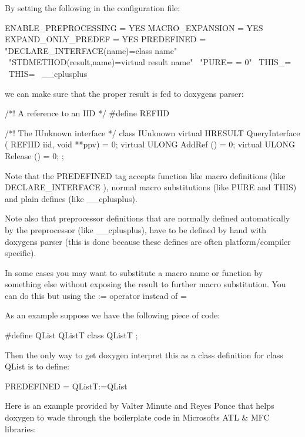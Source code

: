 By setting the following in the configuration file\+:

\begin{DoxyVerb}ENABLE_PREPROCESSING = YES
MACRO_EXPANSION      = YES
EXPAND_ONLY_PREDEF   = YES
PREDEFINED           = "DECLARE_INTERFACE(name)=class name" \
                       "STDMETHOD(result,name)=virtual result name" \
                       "PURE= = 0" \
                       THIS_= \
                       THIS= \
               __cplusplus
\end{DoxyVerb}


we can make sure that the proper result is fed to doxygen\textquotesingle{}s parser\+: \begin{DoxyVerb}/*! A reference to an IID */
#define REFIID

/*! The IUnknown interface */
class  IUnknown
{
  virtual  HRESULT   QueryInterface ( REFIID iid, void **ppv) = 0;
  virtual  ULONG   AddRef () = 0;
  virtual  ULONG   Release () = 0;
};
\end{DoxyVerb}


Note that the P\+R\+E\+D\+E\+F\+I\+N\+ED tag accepts function like macro definitions (like {\ttfamily D\+E\+C\+L\+A\+R\+E\+\_\+\+I\+N\+T\+E\+R\+F\+A\+CE} ), normal macro substitutions (like {\ttfamily P\+U\+RE} and {\ttfamily T\+H\+IS}) and plain defines (like {\ttfamily \+\_\+\+\_\+cplusplus}).

Note also that preprocessor definitions that are normally defined automatically by the preprocessor (like {\ttfamily \+\_\+\+\_\+cplusplus}), have to be defined by hand with doxygen\textquotesingle{}s parser (this is done because these defines are often platform/compiler specific).

In some cases you may want to substitute a macro name or function by something else without exposing the result to further macro substitution. You can do this but using the {\ttfamily \+:=} operator instead of {\ttfamily =}

As an example suppose we have the following piece of code\+: \begin{DoxyVerb}#define QList QListT
class QListT
{
};
\end{DoxyVerb}


Then the only way to get doxygen interpret this as a class definition for class {\ttfamily Q\+List} is to define\+: \begin{DoxyVerb}PREDEFINED = QListT:=QList
\end{DoxyVerb}


Here is an example provided by Valter Minute and Reyes Ponce that helps doxygen to wade through the boilerplate code in Microsoft\textquotesingle{}s A\+TL \& M\+FC libraries\+:

